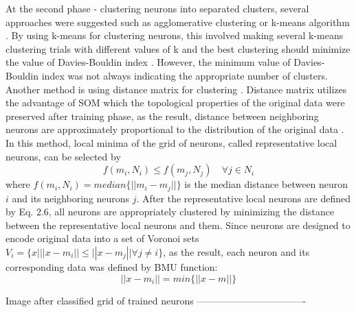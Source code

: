 At the second phase - clustering neurons into separated clusters, several approaches were suggested such as agglomerative clustering or k-means algorithm \cite{vesanto2000clustering} \cite{lampinen1993clustering}. By using k-means for clustering neurons, this involved making several k-means clustering trials with different values of k \cite{vesanto2000clustering} and the best clustering should minimize the value of Davies-Bouldin index \cite{davies1979cluster}. However, the minimum value of Davies-Bouldin index was not always indicating the appropriate number of clusters. Another method is using distance matrix for clustering \cite{vesanto2002distance}. Distance matrix utilizes the advantage of SOM which the topological properties of the original data were preserved after training phase, as the result, distance between neighboring neurons are approximately proportional to the distribution of the original data \cite{vesanto2002distance}. In this method, local minima of the grid of neurons, called representative local neurons, can be selected by
\begin{equation}
f(m_i,N_i) \le f(m_j,N_j) \quad	\forall j \in N_i 
\end{equation}
where $f(m_i,N_i)=median\{||m_i-m_j||\}$ is the median distance between neuron $i$ and its neighboring neurons $j$. 
After the representative local neurons are defined by Eq. 2.6, all neurons are appropriately clustered by minimizing the distance between the representative local neurons and them.
Since neurons are designed to encode original data into a set of Voronoi sets $V_i = \{ x| ||x-m_i|| \le ||x-m_j|| \forall j \ne i\}$, as the result, each neuron and its corresponding data was defined by BMU function:  
\begin{equation}
||x - m_{i}|| = min\{||x-m||\}
\end{equation}

Image after classified grid of trained neurons ----------------------------------